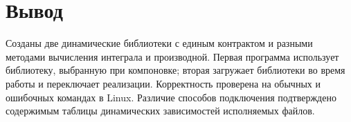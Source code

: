 \documentclass[12pt,a4paper]{article}
\begin{document}
\section{Вывод}

Созданы две динамические библиотеки с единым контрактом и разными методами
вычисления интеграла и производной. Первая программа использует библиотеку,
выбранную при компоновке; вторая загружает библиотеки во время работы и
переключает реализации. Корректность проверена на обычных и ошибочных
командах в Linux. Различие способов подключения подтверждено содержимым
таблицы динамических зависимостей исполняемых файлов.
\end{document}
